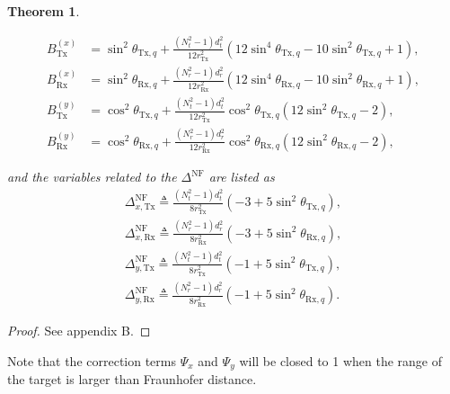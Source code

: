 \documentclass[9pt,final,journal,twocolumn]{IEEEtran}
\newtheorem{theorem}{Theorem}
\begin{document}
\begin{theorem}
\begin{small}
\begin{subequations}
\begin{align}
B_{\mathrm{Tx}}^{(x)} 
&\!=\! \sin^{2}\theta_{\mathrm{Tx},q}
\!+\! \frac{\left(N_t^{2}\!-\!1\right)d_t^{2}}{12r_{\mathrm{Tx}}^{2}}
\left(12\sin^{4}\theta_{\mathrm{Tx},q}\!-\!10\sin^{2}\theta_{\mathrm{Tx},q}\!+\!1\right), \\
B_{\mathrm{Rx}}^{(x)} 
&\!=\! \sin^{2}\theta_{\mathrm{Rx},q}
\!+\! \frac{\left(N_r^{2}\!-\!1\right)d_r^{2}}{12r_{\mathrm{Rx}}^{2}}
\left(12\sin^{4}\theta_{\mathrm{Rx},q}\!-\!10\sin^{2}\theta_{\mathrm{Rx},q}\!+\!1\right), \\
B_{\mathrm{Tx}}^{(y)} 
&\!=\! \cos^{2}\theta_{\mathrm{Tx},q}
\!+\! \frac{\left(N_t^{2}\!-\!1\right)d_t^{2}}{12r_{\mathrm{Tx}}^{2}}
\cos^{2}\theta_{\mathrm{Tx},q}\left(12\sin^{2}\theta_{\mathrm{Tx},q}\!-\!2\right), \\
B_{\mathrm{Rx}}^{(y)} 
&\!=\! \cos^{2}\theta_{\mathrm{Rx},q}
\!+\! \frac{\left(N_r^{2}\!-\!1\right)d_r^{2}}{12r_{\mathrm{Rx}}^{2}}
\cos^{2}\theta_{\mathrm{Rx},q}\left(12\sin^{2}\theta_{\mathrm{Rx},q}\!-\!2\right),
\end{align}
\end{subequations}
\end{small}
and the variables related to the $\Delta^{\mathrm{NF}}$ are listed as 
\begin{subequations}
\begin{align}
 \Delta_{x,\mathrm{Tx}}^{\mathrm{NF}} \triangleq \frac{\left(N_t^{2}-1\right)d_t^{2}}{8r_{\mathrm{Tx}}^{2}}
\left(-3+5\sin^{2}\theta_{\mathrm{Tx},q}\right),\\
\Delta_{x,\mathrm{Rx}}^{\mathrm{NF}} \triangleq \frac{\left(N_r^{2}-1\right)d_r^{2}}{8r_{\mathrm{Rx}}^{2}}
\left(-3+5\sin^{2}\theta_{\mathrm{Rx},q}\right),  \\
\Delta_{y,\mathrm{Tx}}^{\mathrm{NF}} \triangleq \frac{\left(N_t^{2}-1\right)d_t^{2}}{8r_{\mathrm{Tx}}^{2}}
\left(-1+5\sin^{2}\theta_{\mathrm{Tx},q}\right),\\
\Delta_{y,\mathrm{Rx}}^{\mathrm{NF}} \triangleq \frac{\left(N_r^{2}-1\right)d_r^{2}}{8r_{\mathrm{Rx}}^{2}}
\left(-1+5\sin^{2}\theta_{\mathrm{Rx},q}\right).
\end{align}
\end{subequations}
%
\end{theorem}
%

\begin{proof}
    See appendix B.
\end{proof}

Note that the correction terms $\Psi_{x}$ and $\Psi_{y}$ will be closed to 1 when the range of the target is larger than Fraunhofer distance.
%
\end{document}
